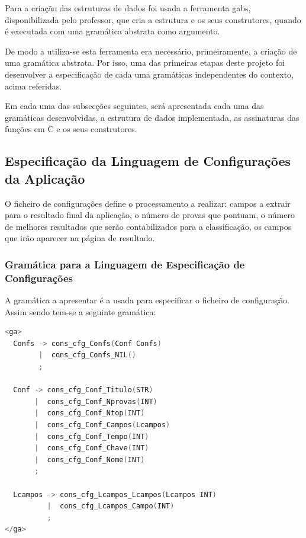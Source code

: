 \documentclass[11pt, a4paper, oneside]{article}
\begin{document}
Para a criação das estruturas de dados foi usada a ferramenta \textsf{gabs}, disponibilizada pelo professor, que cria a estrutura e os seus construtores, quando é executada com uma gramática abstrata como argumento.

De modo a utiliza-se esta ferramenta era necessário, primeiramente, a criação de uma gramática abstrata. Por isso, uma das primeiras etapas deste projeto foi desenvolver a especificação de cada uma gramáticas independentes do contexto, acima referidas. 

Em cada uma das subsecções seguintes, será apresentada cada uma das gramáticas desenvolvidas, a estrutura de dados implementada, as assinaturas das funções em C e os seus construtores.

\subsection{Especificação da Linguagem de Configurações da Aplicação}

O ficheiro de configurações define o processamento a realizar: campos a extrair para o resultado final da aplicação, o número de provas que pontuam, o número de melhores resultados que serão contabilizados para a classificação, os campos que irão aparecer na página de resultado.
\newpage

\subsubsection{Gramática para a Linguagem de Especificação de Configurações}

A gramática a apresentar é a usada para especificar o ficheiro de configuração. Assim sendo tem-se a seguinte gramática:

\begin{lstlisting}[language=C, caption={Gramática para a linguagem de especificação de
 configurações.}]
<ga>
  Confs -> cons_cfg_Confs(Conf Confs)
        |  cons_cfg_Confs_NIL()
        ;

  Conf -> cons_cfg_Conf_Titulo(STR)
       |  cons_cfg_Conf_Nprovas(INT)
       |  cons_cfg_Conf_Ntop(INT)
       |  cons_cfg_Conf_Campos(Lcampos)
       |  cons_cfg_Conf_Tempo(INT)
       |  cons_cfg_Conf_Chave(INT)
       |  cons_cfg_Conf_Nome(INT)
       ;

  Lcampos -> cons_cfg_Lcampos_Lcampos(Lcampos INT)
          |  cons_cfg_Lcampos_Campo(INT)
          ;
</ga>
\end{lstlisting}
\end{document}
